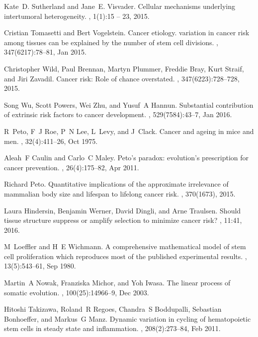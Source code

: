 \documentclass[aps,singlecolumn]{revtex4-1}
\begin{document}
\begin{thebibliography}{10}
Kate~D. Sutherland and Jane~E. Visvader.
\newblock Cellular mechanisms underlying intertumoral heterogeneity.
, 1(1):15 -- 23, 2015.

Cristian Tomasetti and Bert Vogelstein.
\newblock Cancer etiology. variation in cancer risk among tissues can be
  explained by the number of stem cell divisions.
, 347(6217):78--81, Jan 2015.

Christopher Wild, Paul Brennan, Martyn Plummer, Freddie Bray, Kurt Straif, and
  Jiri Zavadil.
\newblock Cancer risk: Role of chance overstated.
, 347(6223):728--728, 2015.

Song Wu, Scott Powers, Wei Zhu, and Yusuf~A Hannun.
\newblock Substantial contribution of extrinsic risk factors to cancer
  development.
, 529(7584):43--7, Jan 2016.

R~Peto, F~J Roe, P~N Lee, L~Levy, and J~Clack.
\newblock Cancer and ageing in mice and men.
, 32(4):411--26, Oct 1975.

Aleah~F Caulin and Carlo~C Maley.
\newblock Peto's paradox: evolution's prescription for cancer prevention.
, 26(4):175--82, Apr 2011.

Richard Peto.
\newblock Quantitative implications of the approximate irrelevance of mammalian
  body size and lifespan to lifelong cancer risk.
, 370(1673), 2015.

Laura Hindersin, Benjamin Werner, David Dingli, and Arne Traulsen.
\newblock Should tissue structure suppress or amplify selection to minimize
  cancer risk?
, 11:41, 2016.

M~Loeffler and H~E Wichmann.
\newblock A comprehensive mathematical model of stem cell proliferation which
  reproduces most of the published experimental results.
, 13(5):543--61, Sep 1980.

Martin~A Nowak, Franziska Michor, and Yoh Iwasa.
\newblock The linear process of somatic evolution.
, 100(25):14966--9, Dec 2003.

Hitoshi Takizawa, Roland~R Regoes, Chandra~S Boddupalli, Sebastian Bonhoeffer,
  and Markus~G Manz.
\newblock Dynamic variation in cycling of hematopoietic stem cells in steady
  state and inflammation.
, 208(2):273--84, Feb 2011.


\end{thebibliography}
\end{document}
